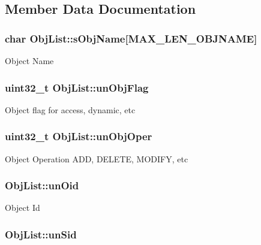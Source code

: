 \subsection{Member Data Documentation}
\hypertarget{structObjList_aa8e6af61ee6cc0ab577074e55b3aa1dd}{
\subsubsection[{s\-Obj\-Name}]{\setlength{\rightskip}{0pt plus 5cm}char Obj\-List\-::s\-Obj\-Name\mbox{[}{\bf M\-A\-X\-\_\-\-L\-E\-N\-\_\-\-O\-B\-J\-N\-A\-M\-E}\mbox{]}}}\label{structObjList_aa8e6af61ee6cc0ab577074e55b3aa1dd}
Object Name \hypertarget{structObjList_ac19269ddfee19096edfdf8ff4fa3d8a9}{
\subsubsection[{un\-Obj\-Flag}]{\setlength{\rightskip}{0pt plus 5cm}uint32\-\_\-t Obj\-List\-::un\-Obj\-Flag}}\label{structObjList_ac19269ddfee19096edfdf8ff4fa3d8a9}
Object flag for access, dynamic, etc \hypertarget{structObjList_a74aa7207a30c674333067077083e43d4}{
\subsubsection[{un\-Obj\-Oper}]{\setlength{\rightskip}{0pt plus 5cm}uint32\-\_\-t Obj\-List\-::un\-Obj\-Oper}}\label{structObjList_a74aa7207a30c674333067077083e43d4}
Object Operation A\-D\-D, D\-E\-L\-E\-T\-E, M\-O\-D\-I\-F\-Y, etc \hypertarget{structObjList_ac83adce2eb39530e198b835134744ce7}{
\subsubsection[{un\-Oid}]{ Obj\-List\-::un\-Oid}}\label{structObjList_ac83adce2eb39530e198b835134744ce7}
Object Id \hypertarget{structObjList_a450648612115440cad362b3a31a1e1df}{
\subsubsection[{un\-Sid}]{ Obj\-List\-::un\-Sid}}\label{structObjList_a450648612115440cad362b3a31a1e1df}
